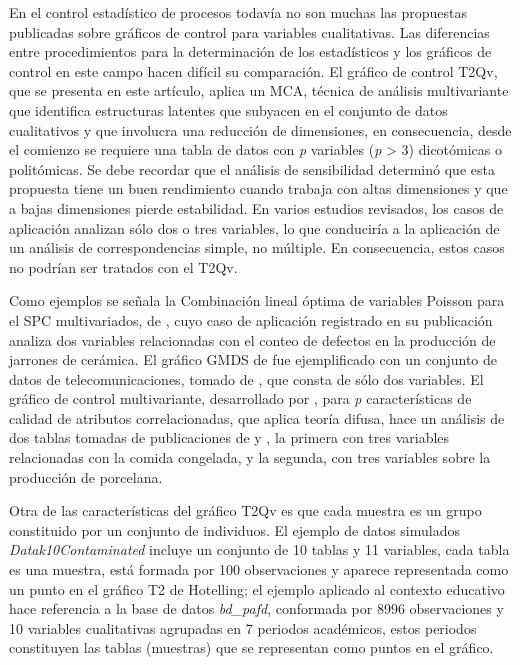 \documentclass[mathematics,article,submit,moreauthors,pdftex]{mdpi}
\begin{document}
En el control estadístico de procesos todavía no son muchas las
propuestas publicadas sobre gráficos de control para variables
cualitativas. Las diferencias entre procedimientos para la determinación
de los estadísticos y los gráficos de control en este campo hacen
difícil su comparación. El gráfico de control T2Qv, que se presenta en
este artículo, aplica un MCA, técnica de análisis multivariante que
identifica estructuras latentes que subyacen en el conjunto de datos
cualitativos y que involucra una reducción de dimensiones, en
consecuencia, desde el comienzo se requiere una tabla de datos con
\emph{p} variables (\emph{p} \textgreater{} 3) dicotómicas o
politómicas. Se debe recordar que el análisis de sensibilidad determinó
que esta propuesta tiene un buen rendimiento cuando trabaja con altas
dimensiones y que a bajas dimensiones pierde estabilidad. En varios
estudios revisados, los casos de aplicación analizan sólo dos o tres
variables, lo que conduciría a la aplicación de un análisis de
correspondencias simple, no múltiple. En consecuencia, estos casos no
podrían ser tratados con el T2Qv.

Como ejemplos se señala la Combinación lineal óptima de variables
Poisson para el SPC multivariados, de \citet{epprecht2013optimal}, cuyo
caso de aplicación registrado en su publicación analiza dos variables
relacionadas con el conteo de defectos en la producción de jarrones de
cerámica. El gráfico GMDS de \citet{raza2019design} fue ejemplificado
con un conjunto de datos de telecomunicaciones, tomado de
\citet{jiang2002process}, que consta de sólo dos variables. El gráfico
de control multivariante, desarrollado por
\citet{pastuizaca2015multivariate}, para \emph{p} características de
calidad de atributos correlacionadas, que aplica teoría difusa, hace un
análisis de dos tablas tomadas de publicaciones de
\citet{taleb2009control} y \citet{taleb2006multivariate}, la primera con
tres variables relacionadas con la comida congelada, y la segunda, con
tres variables sobre la producción de porcelana.

Otra de las características del gráfico T2Qv es que cada muestra es un
grupo constituido por un conjunto de individuos. El ejemplo de datos
simulados \emph{Datak10Contaminated} incluye un conjunto de 10 tablas y
11 variables, cada tabla es una muestra, está formada por 100
observaciones y aparece representada como un punto en el gráfico T2 de
Hotelling; el ejemplo aplicado al contexto educativo hace referencia a
la base de datos \emph{bd\_pafd}, conformada por 8996 observaciones y 10
variables cualitativas agrupadas en 7 periodos académicos, estos
periodos constituyen las tablas (muestras) que se representan como
puntos en el gráfico.
\end{document}
